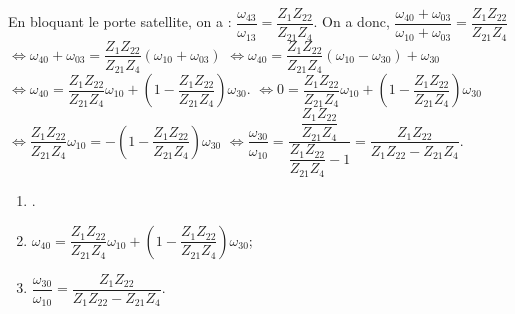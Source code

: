 \begin{corrigebox}
En bloquant le porte satellite, on a : $\dfrac{\omega_{43}}{\omega_{13}}=\dfrac{Z_{1}Z_{22}}{Z_{21}Z_{4}}$.
  On a donc, 
  $\dfrac{\omega_{40}+\omega_{03}}{\omega_{10}+\omega_{03}}=
\dfrac{Z_{1}Z_{22}}{Z_{21}Z_{4}}$
  $\Leftrightarrow \omega_{40}+\omega_{03}=\dfrac{Z_{1}Z_{22}}{Z_{21}Z_{4}}\left( \omega_{10}+\omega_{03} \right)$
  $\Leftrightarrow \omega_{40}=\dfrac{Z_{1}Z_{22}}{Z_{21}Z_{4}}\left( \omega_{10}-\omega_{30} \right) + \omega_{30}$
 $\Leftrightarrow \omega_{40}=\dfrac{Z_{1}Z_{22}}{Z_{21}Z_{4}}\omega_{10} +\left(1- \dfrac{Z_{1}Z_{22}}{Z_{21}Z_{4}}\right)\omega_{30}$.
$\Leftrightarrow 0=\dfrac{Z_{1}Z_{22}}{Z_{21}Z_{4}}\omega_{10} +\left(1- \dfrac{Z_{1}Z_{22}}{Z_{21}Z_{4}}\right)\omega_{30}$
$\Leftrightarrow  \dfrac{Z_{1}Z_{22}}{Z_{21}Z_{4}}\omega_{10} =-\left(1- \dfrac{Z_{1}Z_{22}}{Z_{21}Z_{4}}\right)\omega_{30}$
$\Leftrightarrow  \dfrac{\omega_{30}}{\omega_{10}} = \dfrac{ \dfrac{Z_{1}Z_{22}}{Z_{21}Z_{4}}}{ \dfrac{Z_{1}Z_{22}}{Z_{21}Z_{4}}-1}= \dfrac{ {Z_{1}Z_{22}}}{ {Z_{1}Z_{22}}-Z_{21}Z_{4}}$.

\begin{enumerate}
\item .
\item  $\omega_{40}=\dfrac{Z_{1}Z_{22}}{Z_{21}Z_{4}}\omega_{10} +\left(1- \dfrac{Z_{1}Z_{22}}{Z_{21}Z_{4}}\right)\omega_{30}$;
\item  $\dfrac{\omega_{30}}{\omega_{10}}= \dfrac{ {Z_{1}Z_{22}}}{ {Z_{1}Z_{22}}-Z_{21}Z_{4}}$.
\end{enumerate}
\end{corrigebox}
